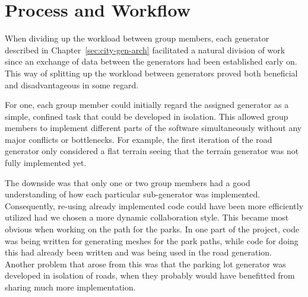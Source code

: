 \section{Process and Workflow}
When dividing up the workload between group members, each generator described in Chapter~\ref{sec:city-gen-arch} facilitated a natural division of work since an exchange of data between the generators had been established early on.
This way of splitting up the workload between generators proved both beneficial and disadvantageous in some regard.

For one, each group member could initially regard the assigned generator as a simple, confined task that could be developed in isolation.
This allowed group members to implement different parts of the software simultaneously without any major conflicts or bottlenecks.
For example, the first iteration of the road generator only considered a flat terrain seeing that the terrain generator was not fully implemented yet.

The downside was that only one or two group members had a good understanding of how each particular sub-generator was implemented.
Consequently, re-using already implemented code could have been more efficiently utilized had we chosen a more dynamic collaboration style.
This became most obvious when working on the path for the parks.
In one part of the project, code was being written for generating meshes for the park paths, while code for doing this had already been written and was being used in the road generation.
Another problem that arose from this was that the parking lot generator was developed in isolation of roads, when they probably would have benefitted from sharing much more implementation.


